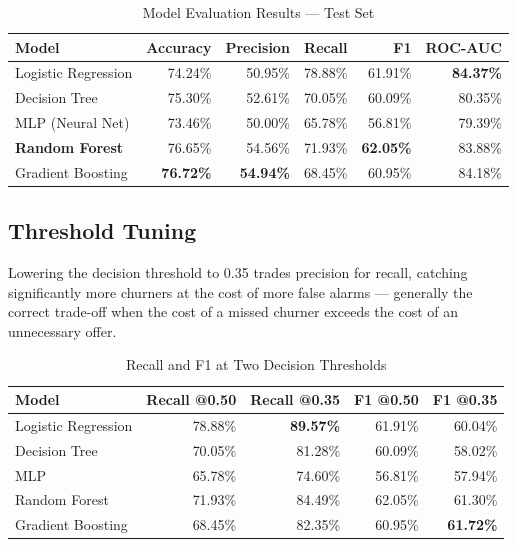 \documentclass[12pt,a4paper]{article}
\begin{document}
\begin{table}[H]
\centering
\caption{Model Evaluation Results --- Test Set}
\begin{tabular}{lrrrrr}
    \toprule
    \textbf{Model} & \textbf{Accuracy} & \textbf{Precision} & \textbf{Recall} & \textbf{F1} & \textbf{ROC-AUC} \\
    \midrule
    Logistic Regression         & 74.24\% & 50.95\% & 78.88\% & 61.91\% & \textbf{84.37\%} \\
    Decision Tree               & 75.30\% & 52.61\% & 70.05\% & 60.09\% & 80.35\% \\
    MLP (Neural Net)            & 73.46\% & 50.00\% & 65.78\% & 56.81\% & 79.39\% \\
    \textbf{Random Forest}      & 76.65\% & 54.56\% & 71.93\% & \textbf{62.05\%} & 83.88\% \\
    Gradient Boosting           & \textbf{76.72\%} & \textbf{54.94\%} & 68.45\% & 60.95\% & 84.18\% \\
    \bottomrule
\end{tabular}
\end{table}

\subsection{Threshold Tuning}

Lowering the decision threshold to 0.35 trades precision for recall, catching significantly more churners at the cost of more false alarms --- generally the correct trade-off when the cost of a missed churner exceeds the cost of an unnecessary offer.

\begin{table}[H]
\centering
\caption{Recall and F1 at Two Decision Thresholds}
\begin{tabular}{lrrrr}
    \toprule
    \textbf{Model} & \textbf{Recall @0.50} & \textbf{Recall @0.35} & \textbf{F1 @0.50} & \textbf{F1 @0.35} \\
    \midrule
    Logistic Regression & 78.88\% & \textbf{89.57\%} & 61.91\% & 60.04\% \\
    Decision Tree       & 70.05\% & 81.28\% & 60.09\% & 58.02\% \\
    MLP                 & 65.78\% & 74.60\% & 56.81\% & 57.94\% \\
    Random Forest       & 71.93\% & 84.49\% & 62.05\% & 61.30\% \\
    Gradient Boosting   & 68.45\% & 82.35\% & 60.95\% & \textbf{61.72\%} \\
    \bottomrule
\end{tabular}
\end{table}
\end{document}
